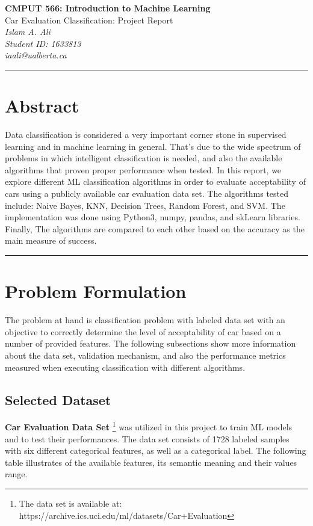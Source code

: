 \documentclass{article}
\begin{document}
\begin{center}
{\bf CMPUT 566: Introduction to Machine Learning}  \\
{Car Evaluation Classification: Project Report} \\
\vspace{.1in}
{\em Islam A. Ali}\\
{\em Student ID: 1633813}\\
{\em iaali@ualberta.ca}\\
\end{center}
\noindent\rule{\textwidth}{1pt}

\section*{Abstract}
Data classification is considered a very important corner stone in supervised learning and in machine learning in general. That's due to the wide spectrum of problems in which intelligent classification is needed, and also the available algorithms that proven proper performance when tested. In this report, we explore different ML classification algorithms in order to evaluate acceptability of cars using a publicly available car evaluation data set. The algorithms tested include: Naive Bayes, KNN, Decision Trees, Random Forest, and SVM. The implementation was done using Python3, numpy, pandas, and skLearn libraries. Finally, The algorithms are compared to each other based on the accuracy as the main measure of success.

\noindent\rule{\textwidth}{1pt}

\section{Problem Formulation}
The problem at hand is classification problem with labeled data set with an objective to correctly determine the level of acceptability of car based on a number of provided features. The following subsections show more information about the data set, validation mechanism, and also the performance metrics measured when executing classification with different algorithms.

\subsection{Selected Dataset}
\textbf{Car Evaluation Data Set} \footnote{The data set is available at: https://archive.ics.uci.edu/ml/datasets/Car+Evaluation} was utilized in this project to train ML models and to test their performances. The data set consists of 1728 labeled samples with six different categorical features, as well as a categorical label. The following table illustrates of the available features, its semantic meaning and their values range.
\end{document}
